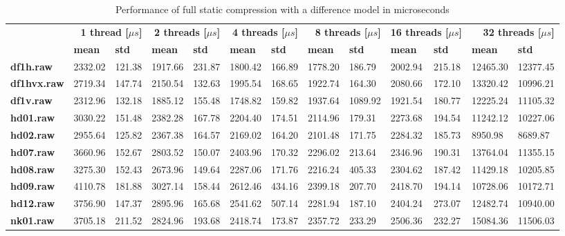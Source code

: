 \begin{table}[ht!]
\centering
\small
\begin{tabular}{l|ll|ll|ll|ll|ll|ll}
    & \multicolumn{2}{r|}{\textbf{1 thread [$\mu s$]}} & \multicolumn{2}{r|}{\textbf{2 threads [$\mu s$]}} & \multicolumn{2}{r|}{\textbf{4 threads [$\mu s$]}} & \multicolumn{2}{r|}{\textbf{8 threads [$\mu s$]}} & \multicolumn{2}{r|}{\textbf{16 threads [$\mu s$]}} & \multicolumn{2}{r}{\textbf{32 threads [$\mu s$]}} \\
    & \textbf{mean} & \textbf{std} & \textbf{mean} & \textbf{std} & \textbf{mean} & \textbf{std} & \textbf{mean} & \textbf{std} & \textbf{mean} & \textbf{std} & \textbf{mean} & \textbf{std} \\
\hline
    \textbf{df1h.raw} & 2332.02 & 121.38 & 1917.66 & 231.87 & 1800.42 & 166.89 & 1778.20 & 186.79 & 2002.94 & 215.18 & 12465.30 & 12377.45 \\
    \textbf{df1hvx.raw} & 2719.34 & 147.74 & 2150.54 & 132.63 & 1995.54 & 168.65 & 1922.74 & 164.30 & 2080.66 & 172.10 & 13320.42 & 10996.21 \\
    \textbf{df1v.raw} & 2312.96 & 132.18 & 1885.12 & 155.48 & 1748.82 & 159.82 & 1937.64 & 1089.92 & 1921.54 & 180.77 & 12225.24 & 11105.32 \\
    \textbf{hd01.raw} & 3030.22 & 151.48 & 2382.28 & 167.78 & 2204.40 & 174.51 & 2114.96 & 179.31 & 2273.68 & 194.54 & 11242.12 & 10227.06 \\
    \textbf{hd02.raw} & 2955.64 & 125.82 & 2367.38 & 164.57 & 2169.02 & 164.20 & 2101.48 & 171.75 & 2284.32 & 185.73 & 8950.98 & 8689.87 \\
    \textbf{hd07.raw} & 3660.96 & 152.67 & 2803.52 & 150.07 & 2403.96 & 170.32 & 2296.02 & 213.64 & 2346.96 & 190.31 & 13764.04 & 11355.15 \\
    \textbf{hd08.raw} & 3275.30 & 152.43 & 2673.96 & 149.64 & 2287.06 & 171.76 & 2216.24 & 405.33 & 2304.62 & 187.42 & 11429.18 & 10205.85 \\
    \textbf{hd09.raw} & 4110.78 & 181.88 & 3027.14 & 158.44 & 2612.46 & 434.16 & 2399.18 & 207.70 & 2418.70 & 194.14 & 10728.06 & 10172.71 \\
    \textbf{hd12.raw} & 3756.90 & 147.37 & 2895.96 & 165.68 & 2541.62 & 507.14 & 2281.94 & 187.10 & 2404.24 & 273.07 & 12482.74 & 10940.00 \\
    \textbf{nk01.raw} & 3705.18 & 211.52 & 2824.96 & 193.68 & 2418.74 & 173.87 & 2357.72 & 233.29 & 2506.36 & 232.27 & 15084.36 & 11506.03 \\
\end{tabular}
\caption{Performance of full static compression with a difference model in microseconds}
\end{table}
